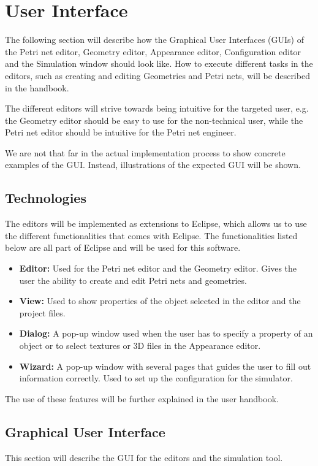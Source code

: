 \section{User Interface}
\label{sec:user-interface}

The following section will describe how the Graphical User Interfaces (GUIs) of the Petri net editor, Geometry editor, Appearance editor, Configuration editor and the Simulation window should look like. How to execute different tasks in the editors, such as creating and editing Geometries and Petri nets, will be described in the handbook. 

The different editors will strive towards being intuitive for the targeted user, e.g. the Geometry editor should be easy to use for the non-technical user, while the Petri net editor should be intuitive for the Petri net engineer.
 
We are not that far in the actual implementation process to show concrete examples of the GUI. Instead, illustrations of the expected GUI will be shown. 

\subsection{Technologies}
The editors will be implemented as extensions to Eclipse, which allows us to use the different functionalities that comes with Eclipse. The functionalities listed below are all part of Eclipse and will be used for this software.

\begin{itemize}
\item{\textbf{Editor:} Used for the Petri net editor and the Geometry editor. Gives the user the ability to create and edit Petri nets and geometries.}
\item{\textbf{View:} Used to show properties of the object selected in the editor and the project files.}
\item{\textbf{Dialog:} A pop-up window used when the user has to specify a property of an object or to select textures or 3D files in the Appearance editor.}
\item{\textbf{Wizard:} A pop-up window with several pages that guides the user to fill out information correctly. Used to set up the configuration for the simulator.}
\end{itemize}

The use of these features will be further explained in the user handbook. 

\subsection{Graphical User Interface}
This section will describe the GUI for the editors and the simulation tool. 

